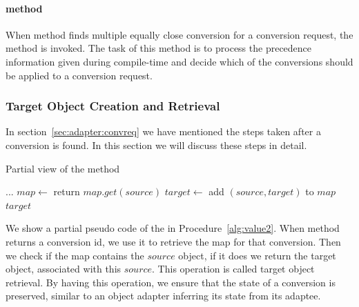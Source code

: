 \paragraph{ method} When  method finds multiple equally close conversion for a conversion request, the  method is invoked.
The task of this method is to process the precedence information given during compile-time and decide which of the conversions should be applied to a conversion request.

\subsubsection{Target Object Creation and Retrieval}
In section~\ref{sec:adapter:convreq} we have mentioned the steps taken after a conversion is found.
In this section we will discuss these steps in detail. 

\begin{algorithm}
\caption{Partial view of the  method}\label{alg:value2}
	\begin{algorithmic}[1]
		...
		\State $map \gets$  \label{getconversionmap2}
			\State return $map.get(source)$ \label{existingconversion2}
		\Else
			\State $target \gets$  \label{newconversion2}
			\State add $(source, target)$ to $map$ \label{addtomap2}
			\State \Return $target$
		\EndIf
		\EndProcedure
	\end{algorithmic}
\end{algorithm}


We show a partial pseudo code of the  in Procedure~\ref{alg:value2}.
When  method returns a conversion id, we use it to retrieve the map for that conversion. 
Then we check if the map contains the $source$ object, if it does we return the target object, associated with this $source$. 
This operation is called target object retrieval. 
By having this operation, we ensure that the state of a conversion is preserved, similar to an object adapter inferring its state from its adaptee. 


